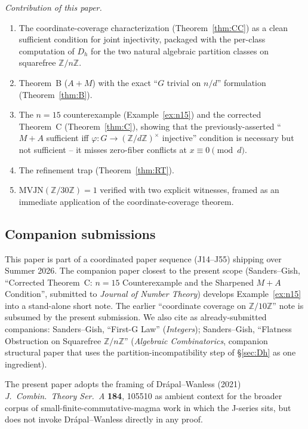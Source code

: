\documentclass[11pt,reqno]{amsart}
\theoremstyle{plain}
\theoremstyle{definition}
\newcommand{\Z}{\mathbb{Z}}
\newcommand{\Zn}{\Z/n\Z}
\begin{document}
\emph{Contribution of this paper.}
\begin{enumerate}[label=(\roman*)]
\item The coordinate-coverage characterization
(Theorem~\ref{thm:CC}) as a clean sufficient condition for joint
injectivity, packaged with the per-class computation of $D_h$ for the
two natural algebraic partition classes on squarefree $\Zn$.
\item Theorem~B ($A{+}M$) with the exact ``$G$ trivial on $n/d$''
formulation (Theorem~\ref{thm:B}).
\item The $n = 15$ counterexample (Example~\ref{ex:n15}) and the
corrected Theorem~C (Theorem~\ref{thm:C}), showing that the
previously-asserted ``$M{+}A$ sufficient iff
$\varphi: G \to (\Z/d\Z)^{\times}$ injective'' condition is
necessary but not sufficient -- it misses zero-fiber conflicts at
$x \equiv 0 \pmod d$.
\item The refinement trap (Theorem~\ref{thm:RT}).
\item $\mathrm{MVJN}(\Z/30\Z) = 1$ verified with two explicit
witnesses, framed as an immediate application of the
coordinate-coverage theorem.
\end{enumerate}

\subsection{Companion submissions} \label{ssec:companions}

This paper is part of a coordinated paper sequence (J14--J55) shipping
over Summer 2026. The companion paper closest to the present scope
(Sanders--Gish, ``Corrected Theorem~C: $n = 15$ Counterexample and
the Sharpened $M{+}A$ Condition'', submitted to \emph{Journal of
Number Theory}) develops Example~\ref{ex:n15} into a stand-alone
short note. The earlier ``coordinate coverage on
$\Z/10\Z$'' note is subsumed by the present submission. We also
cite as already-submitted companions: Sanders--Gish, ``First-G Law''
(\emph{Integers}); Sanders--Gish, ``Flatness Obstruction on Squarefree
$\Z/n\Z$'' (\emph{Algebraic Combinatorics}, companion structural paper
that uses the partition-incompatibility step of \S\ref{sec:Dh} as one
ingredient).

The present paper adopts the framing of Dr\'apal--Wanless (2021)
\emph{J.\ Combin.\ Theory Ser.\ A} \textbf{184}, 105510 as ambient
context for the broader corpus of small-finite-commutative-magma
work in which the J-series sits, but does not invoke
Dr\'apal--Wanless directly in any proof.
\end{document}
